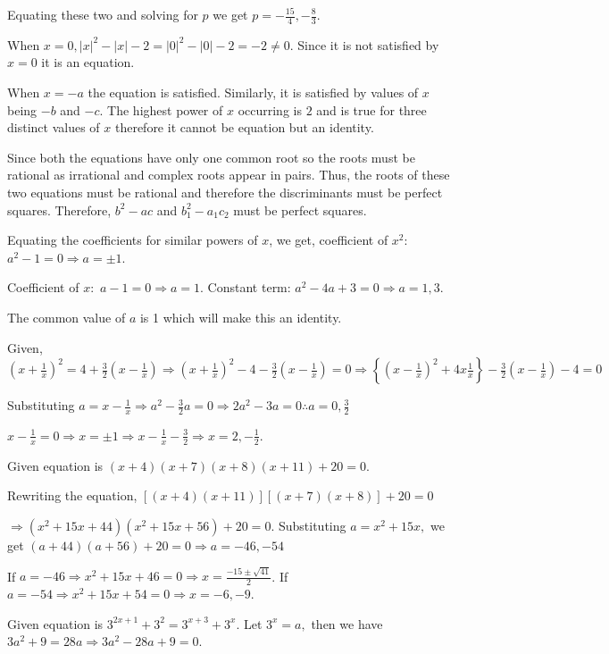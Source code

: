   Equating these two and solving for $p$ we get $p = -\frac{15}{4}, -\frac{8}{3}$.
\item When $x = 0, |x|^2 - |x| - 2 = |0|^2 - |0| - 2 = -2 \ne 0$. Since it is not satisfied by
  $x = 0$ it is an equation.
\item When $x = -a$ the equation is satisfied. Similarly, it is satisfied by values of $x$ being $-b$ and
  $-c$. The highest power of $x$ occurring is $2$ and is true for three distinct values of $x$
  therefore it cannot be equation but an identity.
\item Since both the equations have only one common root so the roots must be rational as irrational and
  complex roots appear in pairs. Thus, the roots of these two equations must be rational and therefore the
  discriminants must be perfect squares. Therefore, $b^2 - ac$ and $b_1^2 - a_1c_2$ must be perfect squares.
\item Equating the coefficients for similar powers of $x$, we get, coefficient of $x^2:$ $a^2 - 1 = 0
  \Rightarrow a = \pm1$.

  Coefficient of $x:$ $a - 1 = 0 \Rightarrow a = 1$. Constant term: $a^2 - 4a + 3 = 0 \Rightarrow a = 1, 3$.

  The common value of $a$ is 1 which will make this an identity.
\item Given, $\left(x + \frac{1}{x}\right)^2 = 4 + \frac{3}{2}\left(x - \frac{1}{x}\right)\Rightarrow
  \left(x + \frac{1}{x}\right)^2 - 4 - \frac{3}{2}\left(x - \frac{1}{x}\right) = 0\Rightarrow \left\{\left(x
  - \frac{1}{x}\right)^2 + 4x\frac{1}{x}\right\} - \frac{3}{2}\left(x - \frac{1}{x}\right) - 4 = 0$

  Substituting $a = x - \frac{1}{x}\Rightarrow a^2 - \frac{3}{2}a = 0 \Rightarrow 2a^2 - 3a = 0 \therefore a
  = 0, \frac{3}{2}$

  $x - \frac{1}{x} = 0 \Rightarrow x = \pm1\Rightarrow x - \frac{1}{x} - \frac{3}{2} \Rightarrow x = 2,
  -\frac{1}{2}$.
\item Given equation is $(x + 4)(x + 7)(x + 8)(x + 11) + 20 = 0$.

  Rewriting the equation, $[(x + 4)(x + 11)][(x + 7)(x + 8)] + 20 = 0$

  $\Rightarrow (x^2 + 15x + 44)(x^2 + 15x + 56) + 20 = 0$. Substituting $a = x^2 + 15x,$ we get $(a + 44)(a
  + 56) + 20 = 0\Rightarrow a = -46, -54$

  If $a = -46 \Rightarrow x^2 + 15x + 46 = 0 \Rightarrow x = \frac{-15 \pm \sqrt{41}}{2}$. If $a = -54
  \Rightarrow x^2 + 15x + 54 = 0 \Rightarrow x = - 6, -9$.
\item Given equation is $3^{2x + 1} + 3^2 = 3^{x + 3} + 3^x$. Let $3^x = a,$ then we have $3a^2 + 9 = 28a
  \Rightarrow 3a^2 - 28a + 9 = 0$.

